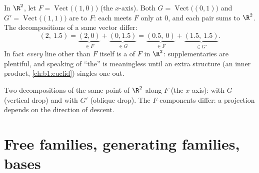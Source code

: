 \begin{example}
\label{ex:b1:vspaces:manysupplements}
In $\R^2$, let $F = \operatorname{Vect}\bigl((1,0)\bigr)$ (the
$x$-axis). Both $G = \operatorname{Vect}\bigl((0,1)\bigr)$ and
$G' = \operatorname{Vect}\bigl((1,1)\bigr)$ are  to
$F$: each meets $F$ only at $0$, and each pair sums to $\R^2$.
The decompositions of a same vector differ:
\[
(2,\ 1.5) = \underbrace{(2, 0)}_{\in F} +
\underbrace{(0, 1.5)}_{\in G}
= \underbrace{(0.5,\ 0)}_{\in F} +
\underbrace{(1.5,\ 1.5)}_{\in G'} .
\]
In fact \emph{every} line other than $F$ itself is a
 of $F$ in $\R^2$: supplementaries are plentiful,
and speaking of ``the''  is meaningless until an
extra structure (an inner product, \cref{ch:b1:euclid}) singles
one out.
\end{example}

\begin{omfigure}

{\small Two decompositions of the same point of $\R^2$ along $F$
(the $x$-axis): with  $G$ (vertical drop) and with
 $G'$ (oblique drop). The $F$-components differ:
a projection depends on the direction of descent.}
\end{omfigure}

\section{Free families, generating families, bases}

